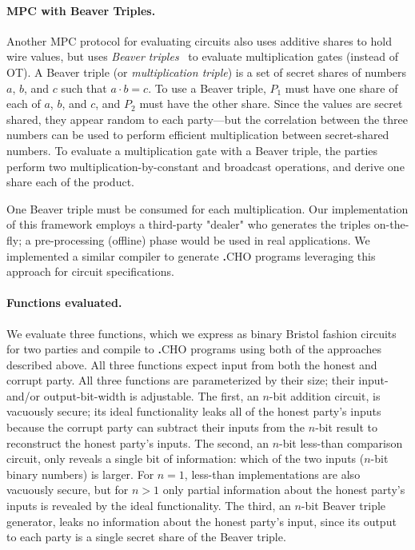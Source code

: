 \documentclass[acmlarge, manuscript, screen, review, anonymous, table]{acmart}
\newcommand{\langname}{\textsc{\textbf{.}CHO}\xspace}
\begin{document}
\paragraph{MPC with Beaver Triples.}
Another MPC protocol for evaluating circuits also uses additive shares to hold wire values,
but uses \emph{Beaver triples}~\cite{beaver1992efficient} to evaluate multiplication gates (instead of OT).
A Beaver triple (or \emph{multiplication triple}) is a set of secret shares of numbers $a$, $b$, and $c$ such that $a \cdot b = c$.
To use a Beaver triple, $P_1$ must have one share of each of $a$, $b$, and $c$, and $P_2$ must have the other share.
Since the values are secret shared, they appear random to each party---but
the correlation between the three numbers can be used to perform efficient multiplication between secret-shared numbers.
To evaluate a multiplication gate with a Beaver triple,
the parties perform two multiplication-by-constant and broadcast operations, and derive one share each of the product.

One Beaver triple must be consumed for each multiplication.
Our implementation of this framework employs a third-party "dealer" who generates the triples on-the-fly;
a pre-processing (offline) phase would be used in real applications.
We implemented a similar compiler to generate \langname programs leveraging this approach for circuit specifications.


\paragraph{Functions evaluated.}
We evaluate three functions, which we express as binary Bristol fashion circuits~\cite{bristol_circuits_website} for two parties
and compile to \langname programs using both of the approaches described above.
All three functions expect input from both the honest and corrupt party.
All three functions are parameterized by their size; their input- and/or output-bit-width is adjustable.
The first, an $n$-bit addition circuit, is vacuously secure;
its ideal functionality leaks all of the honest party's inputs
because the corrupt party can subtract their inputs from the $n$-bit result to reconstruct the honest party's inputs.
The second, an $n$-bit less-than comparison circuit,
only reveals a single bit of information:
which of the two inputs ($n$-bit binary numbers) is larger.
For $n=1$, less-than implementations are also vacuously secure,
but for $n>1$ only partial information about the honest party's inputs is revealed by the ideal functionality.
The third, an $n$-bit Beaver triple generator, leaks no information about the honest party's input,
since its output to each party is a single secret share of the Beaver triple.
\end{document}
